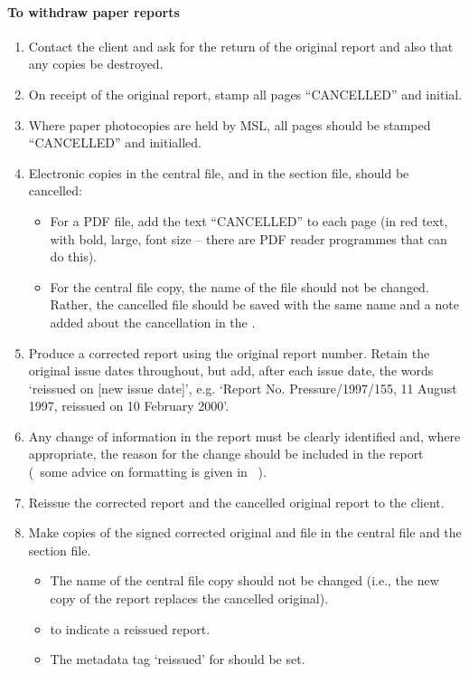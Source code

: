 \paragraph{To withdraw paper reports}
\begin{enumerate}
\item Contact the client and ask for the return of the original report and also that any copies be destroyed. 

\item On receipt of the original report, stamp all pages ``{\color{red}CANCELLED}” and initial. 

\item Where paper photocopies are held by MSL, all pages should be stamped ``{\color{red}CANCELLED}” and initialled.

\item Electronic copies in the central file, and in the section file, should be cancelled:
\begin{itemize}
\item For a PDF file, add the text “{\color{red}CANCELLED}” to each page (in red text, with bold, large, font size – there are PDF reader programmes that can do this). 
\item For the central file copy, the name of the file should not be changed. Rather, the cancelled file should be saved with the same name and a note added about the cancellation in the . 
\end{itemize}

\item Produce a corrected report using the original report number.  Retain the original issue dates throughout, but add, after each issue date, the words `reissued on [new issue date]', e.g. `Report No. Pressure/1997/155, 11 August 1997, reissued on 10 February 2000'.

\item Any change of information in the report must be clearly identified and, where appropriate, the reason for the change should be included in the report (~some advice on formatting is given in \cite[\S\ref*{GRP-ss:reissued_reports}]{MSL_Reporting_Guidelines}~).

\item Reissue the corrected report and the cancelled original report to the client.

\item Make copies of the signed corrected original and file in the central file and the section file. 
\begin{itemize}
\item The name of the central file copy should not be changed (i.e., the new copy of the report replaces the cancelled original). 
\item {} to indicate a reissued report.
\item The metadata tag `reissued' for  should be set.
\end{itemize}

\end{enumerate}

